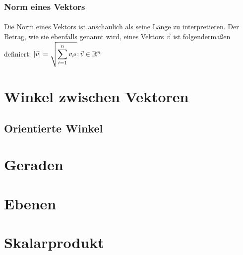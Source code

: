 \subsubsection{Norm eines Vektors}

\paragraph{} Die Norm eines Vektors ist anschaulich als seine Länge zu interpretieren. Der Betrag, wie sie ebenfalls genannt wird, eines Vektors $\vec{v}$ ist folgendermaßen definiert: $\text{|}\vec{v}\text{|} = \sqrt{\displaystyle\sum_{i=1}^{n}v_{i^2}} ; \vec{v}\in\R^n$
\begin{tikzpicture}
\end{tikzpicture}


\section{Winkel zwischen Vektoren}\subsection{Orientierte Winkel}

\section{Geraden}
\section{Ebenen}
\section{Skalarprodukt}
